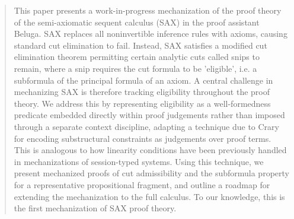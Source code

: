 \begin{abstract}
  This paper presents a work-in-progress mechanization of the proof theory of
  the semi-axiomatic sequent calculus (SAX) in the proof assistant Beluga. SAX
  replaces all noninvertible inference rules with axioms, causing standard cut
  elimination to fail. Instead, SAX satisfies a modified cut elimination theorem
  permitting certain analytic cuts called snips to remain, where a snip requires
  the cut formula to be 'eligible', i.e. a subformula of the principal formula
  of an axiom. A central challenge in mechanizing SAX is therefore tracking
  eligibility throughout the proof theory. We address this by representing
  eligibility as a well-formedness predicate embedded directly within proof
  judgements rather than imposed through a separate context discipline, adapting
  a technique due to Crary for encoding substructural constraints as judgements
  over proof terms. This is analogous to how linearity conditions have been
  previously handled in mechanizations of session-typed systems. Using this
  technique, we present mechanized proofs of cut admissibility and the
  subformula property for a representative propositional fragment, and outline a
  roadmap for extending the mechanization to the full calculus. To our
  knowledge, this is the first mechanization of SAX proof theory.
\end{abstract}




